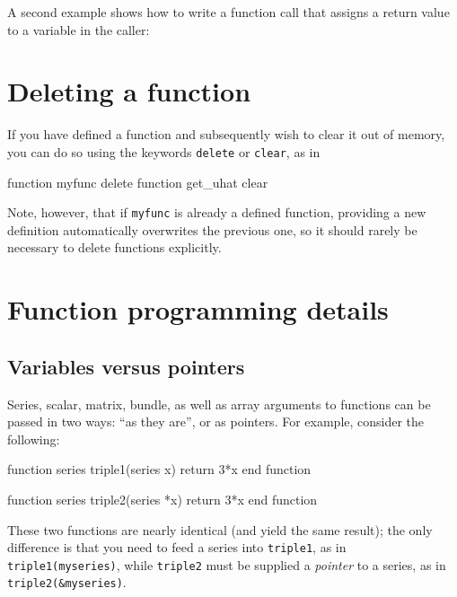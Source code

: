 A second example shows how to write a function call that assigns
a return value to a variable in the caller:
    
\section{Deleting a function}
\label{func-del}

If you have defined a function and subsequently wish to clear it out
of memory, you can do so using the keywords \texttt{delete} or
\texttt{clear}, as in

\begin{code}
function myfunc delete
function get_uhat clear
\end{code}

Note, however, that if \texttt{myfunc} is already a defined function,
providing a new definition automatically overwrites the previous one,
so it should rarely be necessary to delete functions explicitly.

\section{Function programming details}
\label{func-details}

\subsection{Variables versus pointers}
\label{funscope}

Series, scalar, matrix, bundle, as well as array arguments to
functions can be passed in two ways: ``as they are'', or as
pointers. For example, consider the following:
\begin{code}
function series triple1(series x)
  return 3*x
end function
  
function series triple2(series *x)
  return 3*x
end function
\end{code}

These two functions are nearly identical (and yield the same result);
the only difference is that you need to feed a series into
\texttt{triple1}, as in \texttt{triple1(myseries)}, while
\texttt{triple2} must be supplied a \emph{pointer} to a series, as in
\texttt{triple2(\&myseries)}. 

